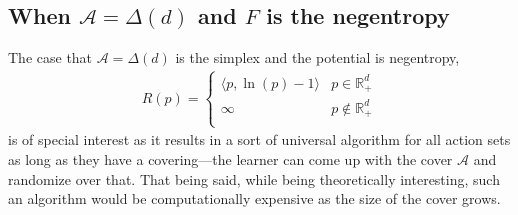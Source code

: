 \documentclass{article}
\theoremstyle{plain}
\theoremstyle{definition}
\newcommand{\Rd}{\mathbb{R}^d}
\newcommand{\cA}{\mathcal A}
\begin{document}
\subsection*{When \texorpdfstring{$\cA=\Delta(d)$}{A=Delta(d)} and \texorpdfstring{$F$}{F} is the negentropy}\label{sec:md-negentropy}
The case that $\cA = \Delta(d)$ is the simplex and the potential
is negentropy,
\begin{align*}
    R(p) = \begin{cases}
               \langle p, \ln(p) - 1 \rangle & p \in \Rd_+    \\
               \infty                        & p \notin \Rd_+ \\
           \end{cases}
\end{align*}
is of special interest as it results in a sort of universal algorithm for all
action sets as long as they have a covering---the learner
can come up with the cover $\cA$ and randomize over that.
That being said, while being theoretically interesting, such an algorithm
would be computationally expensive as the size of the cover grows.
\end{document}
